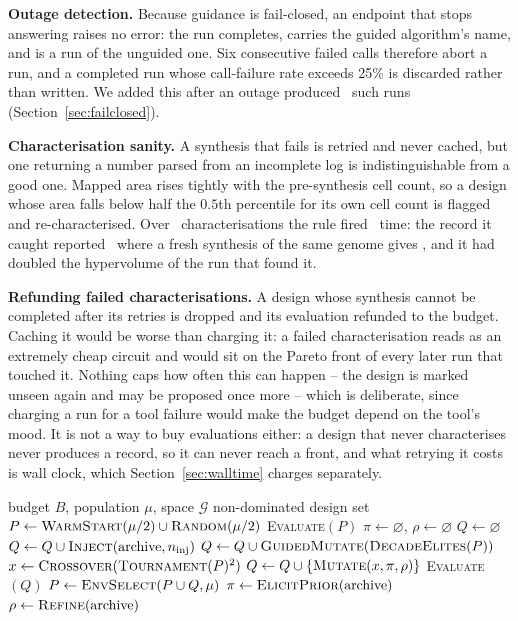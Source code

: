 \documentclass[acmsmall,review,anonymous]{acmart}
\begin{document}
\textbf{Outage detection.}  Because guidance is fail-closed, an endpoint that
stops answering raises no error: the run completes, carries the guided
algorithm's name, and is a run of the unguided one.  Six consecutive failed
calls therefore abort a run, and a completed run whose call-failure rate
exceeds 25\% is discarded rather than written.  We added this after an outage
produced \DeadRuns\ such runs (Section~\ref{sec:failclosed}).

\textbf{Characterisation sanity.}  A synthesis that fails is retried and never
cached, but one returning a number parsed from an incomplete log is
indistinguishable from a good one.  Mapped area rises tightly with the
pre-synthesis cell count, so a design whose area falls below half the
$0.5$th percentile for its own cell count is flagged and re-characterised.
Over \NcharTotal\ characterisations the rule fired \NcharBad\ time: the record
it caught reported \NcharBadArea\ where a fresh synthesis of the same genome
gives \NcharGoodArea, and it had doubled the hypervolume of the run that found
it.

\textbf{Refunding failed characterisations.}  A design whose synthesis cannot
be completed after its retries is dropped and its evaluation refunded to the
budget.  Caching it would be worse than charging it: a failed characterisation
reads as an extremely cheap circuit and would sit on the Pareto front of every
later run that touched it.  Nothing caps how often this can happen -- the
design is marked unseen again and may be proposed once more -- which is
deliberate, since charging a run for a tool failure would make the budget
depend on the tool's mood.  It is not a way to buy evaluations either: a design
that never characterises never produces a record, so it can never reach a
front, and what retrying it costs is wall clock, which
Section~\ref{sec:walltime} charges separately.

\begin{algorithm}[t]
\small
\caption{Approx-LG}
\label{alg:approxlg}
\begin{algorithmic}[1]
\Require budget $B$, population $\mu$, space $\mathcal{G}$
\Ensure non-dominated design set
\State $P\gets\textsc{WarmStart}(\mu/2)\cup\textsc{Random}(\mu/2)$
\State \textsc{Evaluate}$(P)$
\State $\pi\gets\varnothing$, $\rho\gets\varnothing$ 
  \State $Q\gets\varnothing$
     $Q\gets Q\cup\textsc{Inject}(\mathrm{archive},n_{\mathrm{inj}})$
  \EndIf
  \State $Q\gets Q\cup\textsc{GuidedMutate}(\textsc{DecadeElites}(P))$
     \State $x\gets\textsc{Crossover}(\textsc{Tournament}(P)^2)$
     \State $Q\gets Q\cup\{\textsc{Mutate}(x,\pi,\rho)\}$
  \EndWhile
  \State \textsc{Evaluate}$(Q)$
  \State $P\gets\textsc{EnvSelect}(P\cup Q,\mu)$
   $\pi\gets\textsc{ElicitPrior}(\mathrm{archive})$
  \EndIf
   $\rho\gets\textsc{Refine}(\mathrm{archive})$
  \EndIf
\EndWhile
\end{algorithmic}
\end{algorithm}
\end{document}

